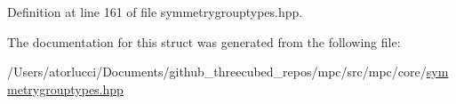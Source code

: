 Definition at line 161 of file symmetrygrouptypes.\+hpp.



The documentation for this struct was generated from the following file\+:\begin{DoxyCompactItemize}
\item 
/\+Users/atorlucci/\+Documents/github\+\_\+threecubed\+\_\+repos/mpc/src/mpc/core/\mbox{\hyperlink{symmetrygrouptypes_8hpp}{symmetrygrouptypes.\+hpp}}\end{DoxyCompactItemize}
